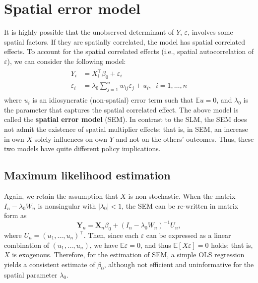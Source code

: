 \documentclass[10.5pt, A4paper, openany, uplatex]{book}
\newcommand{\mbf}{\mathbf}
\newcommand{\eps}{\varepsilon}
\newcommand{\E}{\mathbb{E}}
\numberwithin{equation}{section}
\begin{document}
\section{Spatial error model}\label{sec:SEM}

It is highly possible that the unobserved determinant of $Y$, $\eps$, involves some spatial factors.
If they are spatially correlated, the model has spatial correlated effects.
To account for the spatial correlated effects (i.e., spatial autocorrelation of $\eps$), we can consider the following model:
\begin{align}\label{eq:sem}
\begin{split}
	Y_i  & = X_i^\top\beta_0 + \eps_i \\
	\eps_i & = \lambda_0 \sum_{j = 1}^n w_{ij} \eps_j + u_i, \;\; i = 1,\ldots,n
\end{split}
\end{align}
where $u_i$ is an idiosyncratic (non-spatial) error term such that $\E u = 0$, and $\lambda_0$ is the parameter that captures the spatial correlated effect.
The above model is called the \textbf{spatial error model} (SEM).
In contrast to the SLM, the SEM does not admit the existence of spatial multiplier effects; that is, in SEM, an increase in own $X$ solely influences on own $Y$ and not on the others' outcomes.
Thus, these two models have quite different policy implications.

\subsection{Maximum likelihood estimation}
Again, we retain the assumption that $X$ is non-stochastic.
When the matrix $I_n - \lambda_0 W_n$  is nonsingular with $|\lambda_0| < 1$, the SEM can be re-written in matrix form as
\[
	\mbf{Y}_n =  \mbf{X}_n \beta_0 + (I_n - \lambda_0 W_n)^{-1}U_n,
\]
where $U_n = (u_1, \ldots, u_n)^\top$.
Then, since each $\eps$ can be expressed as a linear combination of $(u_1, \ldots, u_n)$, we have $\E \eps = 0$, and thus $\E[X \eps] = 0$ holds; that is, $X$ is exogenous.
Therefore, for the estimation of SEM, a simple OLS regression yields a consistent estimate of $\beta_0$, although not efficient and uninformative for the spatial parameter $\lambda_0$.
\end{document}
